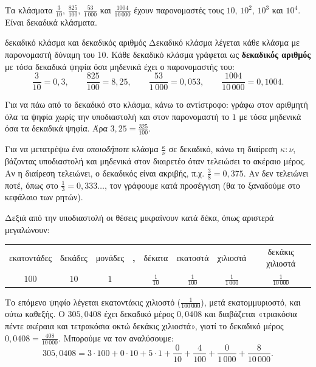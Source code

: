 

Τα κλάσματα $\frac{3}{10}$, $\frac{825}{100}$, $\frac{53}{1\,000}$ και $\frac{1004}{10\,000}$ έχουν παρονομαστές τους $10$, $10^2$, $10^3$ και $10^4$. Είναι δεκαδικά κλάσματα.

\begin{orismos}{δεκαδικό κλάσμα και δεκαδικός αριθμός}
Δεκαδικό κλάσμα λέγεται κάθε κλάσμα με παρονομαστή δύναμη του 10. Κάθε δεκαδικό κλάσμα γράφεται ως \textbf{δεκαδικός αριθμός} με τόσα δεκαδικά ψηφία όσα μηδενικά έχει ο παρονομαστής του:
$$\dfrac{3}{10}=0{,}3,\qquad \dfrac{825}{100}=8{,}25,\qquad \dfrac{53}{1\,000}=0{,}053,\qquad \dfrac{1004}{10\,000}=0{,}1004.$$
\end{orismos}

Για να πάω από το δεκαδικό στο κλάσμα, κάνω το αντίστροφο: γράφω στον αριθμητή όλα τα ψηφία χωρίς την υποδιαστολή και στον παρονομαστή το $1$ με τόσα μηδενικά όσα τα δεκαδικά ψηφία. Άρα $3{,}25=\frac{325}{100}$.

Για να μετατρέψω ένα \emph{οποιοδήποτε} κλάσμα $\frac{\kappa}{\nu}$ σε δεκαδικό, κάνω τη διαίρεση $\kappa:\nu$, βάζοντας υποδιαστολή και μηδενικά στον διαιρετέο όταν τελειώσει το ακέραιο μέρος. Αν η διαίρεση τελειώνει, ο δεκαδικός είναι ακριβής, π.χ. $\frac{3}{8}=0{,}375$. Αν δεν τελειώνει ποτέ, όπως στο $\frac{1}{3}=0{,}333\ldots$, τον γράφουμε κατά προσέγγιση (θα το ξαναδούμε στο κεφάλαιο των ρητών).


Δεξιά από την υποδιαστολή οι θέσεις μικραίνουν κατά δέκα, όπως αριστερά μεγαλώνουν:

\begin{center}\small
\renewcommand{\arraystretch}{1.4}\setlength{\tabcolsep}{3pt}
\begin{tabular}{@{}cccccccc@{}}
\toprule
εκατοντάδες & δεκάδες & μονάδες & \textbf{,} & δέκατα & εκατοστά & χιλιοστά & δεκάκις χιλιοστά\\
$100$ & $10$ & $1$ & & $\frac{1}{10}$ & $\frac{1}{100}$ & $\frac{1}{1\,000}$ & $\frac{1}{10\,000}$\\
\bottomrule
\end{tabular}
\end{center}

Το επόμενο ψηφίο λέγεται εκατοντάκις χιλιοστό ($\frac{1}{100\,000}$), μετά εκατομμυριοστό, και ούτω καθεξής. Ο $305{,}0408$ έχει δεκαδικό μέρος $0{,}0408$ και διαβάζεται «τριακόσια πέντε ακέραια και τετρακόσια οκτώ δεκάκις χιλιοστά», γιατί το δεκαδικό μέρος $0{,}0408=\frac{408}{10\,000}$. Μπορούμε να τον αναλύσουμε:
$$305{,}0408=3\cdot100+0\cdot10+5\cdot1+\dfrac{0}{10}+\dfrac{4}{100}+\dfrac{0}{1\,000}+\dfrac{8}{10\,000}.$$

